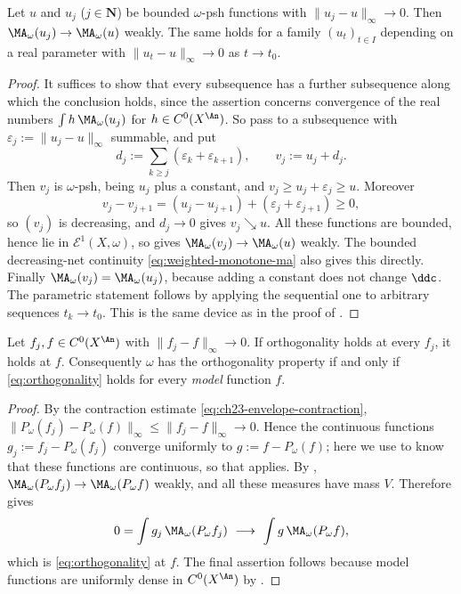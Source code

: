 \begin{lemma}
\label{lem:ch27-uniform-ma}
Let $u$ and $u_j$ ($j\in\mathbf N$) be bounded $\omega$-psh
functions with $\lVert u_j-u\rVert_\infty\to0$.  Then
$\MA_\omega(u_j)\to\MA_\omega(u)$ weakly.  The same holds for a family
$(u_t)_{t\in I}$ depending on a real parameter with
$\lVert u_t-u\rVert_\infty\to0$ as $t\to t_0$.
\end{lemma}

\begin{proof}
It suffices to show that every subsequence has a further subsequence along
which the conclusion holds, since the assertion concerns convergence of the
real numbers $\int h\,\MA_\omega(u_j)$ for $h\in C^0(X^{\An})$.  So pass
to a subsequence with $\varepsilon_j:=\lVert u_j-u\rVert_\infty$
summable, and put
\[
 d_j:=\sum_{k\geq j}(\varepsilon_k+\varepsilon_{k+1}),
 \qquad v_j:=u_j+d_j .
\]
Then $v_j$ is $\omega$-psh, being $u_j$ plus a constant, and
$v_j\geq u_j+\varepsilon_j\geq u$.  Moreover
\[
 v_j-v_{j+1}=(u_j-u_{j+1})+(\varepsilon_j+\varepsilon_{j+1})\geq0,
\]
so $(v_j)$ is decreasing, and $d_j\to0$ gives $v_j\searrow u$.  All
these functions are bounded, hence lie in $\mathcal E^1(X,\omega)$, so
 gives
$\MA_\omega(v_j)\to\MA_\omega(u)$ weakly.  The bounded decreasing-net continuity
\eqref{eq:weighted-monotone-ma} also gives this directly.
Finally
$\MA_\omega(v_j)=\MA_\omega(u_j)$, because adding a constant does not
change $\ddc$.  The parametric statement follows by applying the
sequential one to arbitrary sequences $t_k\to t_0$.  This is the same
device as in the proof of .
\end{proof}

\begin{proposition}
\label{prop:ch27-orthogonality-uniform-limits}
Let $f_j,f\in C^0(X^{\An})$ with $\lVert f_j-f\rVert_\infty\to0$.  If
orthogonality holds at every $f_j$, it holds at $f$.  Consequently
$\omega$ has the orthogonality property if and only if
\eqref{eq:orthogonality} holds for every \emph{model} function $f$.
\end{proposition}

\begin{proof}
By the contraction estimate \eqref{eq:ch23-envelope-contraction},
$\lVert P_\omega(f_j)-P_\omega(f)\rVert_\infty\leq\lVert
f_j-f\rVert_\infty\to0$.  Hence the continuous functions
$g_j:=f_j-P_\omega(f_j)$ converge uniformly to
$g:=f-P_\omega(f)$; here we use  to know
that these functions are continuous, so that
 applies.  By
, $\MA_\omega(P_\omega f_j)\to
\MA_\omega(P_\omega f)$ weakly, and all these measures have mass $V$.
Therefore  gives
\[
 0=\int g_j\,\MA_\omega(P_\omega f_j)
 \ \longrightarrow\
 \int g\,\MA_\omega(P_\omega f),
\]
which is \eqref{eq:orthogonality} at $f$.  The final assertion follows
because model functions are uniformly dense in $C^0(X^{\An})$ by
\Cref{lem:ch23-model-density}.
\end{proof}

